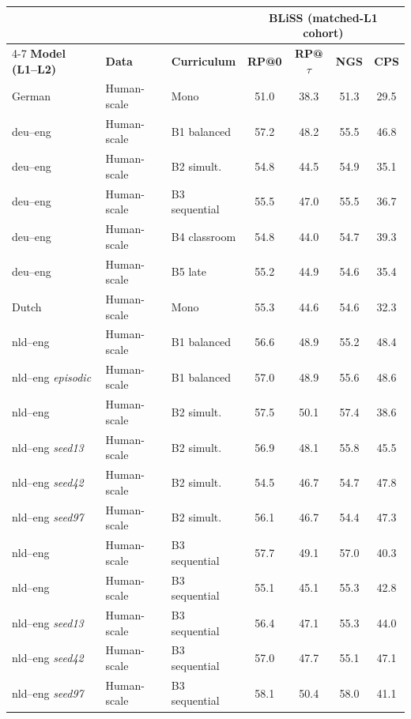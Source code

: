\begin{table}[t]
\centering\small
\setlength{\tabcolsep}{4pt}
\begin{tabular}{lll cccc}
\toprule
& & & \multicolumn{4}{c}{\textbf{BLiSS (matched-L1 cohort)}} \\
\cmidrule(lr){4-7}
\textbf{Model (L1--L2)} & \textbf{Data} & \textbf{Curriculum} & \textbf{RP@0} & \textbf{RP@$\tau$} & \textbf{NGS} & \textbf{CPS} \\
\midrule
German & Human-scale & Mono & 51.0 & 38.3 & 51.3 & 29.5 \\
deu--eng & Human-scale & B1 balanced & 57.2 & 48.2 & 55.5 & 46.8 \\
deu--eng & Human-scale & B2 simult. & 54.8 & 44.5 & 54.9 & 35.1 \\
deu--eng & Human-scale & B3 sequential & 55.5 & 47.0 & 55.5 & 36.7 \\
deu--eng & Human-scale & B4 classroom & 54.8 & 44.0 & 54.7 & 39.3 \\
deu--eng & Human-scale & B5 late & 55.2 & 44.9 & 54.6 & 35.4 \\
Dutch & Human-scale & Mono & 55.3 & 44.6 & 54.6 & 32.3 \\
nld--eng & Human-scale & B1 balanced & 56.6 & 48.9 & 55.2 & 48.4 \\
nld--eng {\scriptsize\textit{episodic}} & Human-scale & B1 balanced & 57.0 & 48.9 & 55.6 & 48.6 \\
nld--eng & Human-scale & B2 simult. & 57.5 & 50.1 & 57.4 & 38.6 \\
nld--eng {\scriptsize\textit{seed13}} & Human-scale & B2 simult. & 56.9 & 48.1 & 55.8 & 45.5 \\
nld--eng {\scriptsize\textit{seed42}} & Human-scale & B2 simult. & 54.5 & 46.7 & 54.7 & 47.8 \\
nld--eng {\scriptsize\textit{seed97}} & Human-scale & B2 simult. & 56.1 & 46.7 & 54.4 & 47.3 \\
nld--eng & Human-scale & B3 sequential & 57.7 & 49.1 & 57.0 & 40.3 \\
nld--eng  & Human-scale & B3 sequential & 55.1 & 45.1 & 55.3 & 42.8 \\
nld--eng {\scriptsize\textit{seed13}} & Human-scale & B3 sequential & 56.4 & 47.1 & 55.3 & 44.0 \\
nld--eng {\scriptsize\textit{seed42}} & Human-scale & B3 sequential & 57.0 & 47.7 & 55.1 & 47.1 \\
nld--eng {\scriptsize\textit{seed97}} & Human-scale & B3 sequential & 58.1 & 50.4 & 58.0 & 41.1 \\

\end{tabular}
\end{table}
